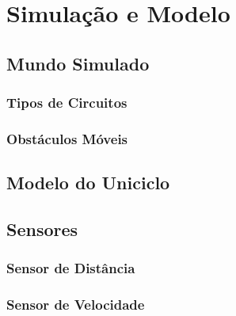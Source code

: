 \chapter{Simulação e Modelo}
\label{ch10}

\section{Mundo Simulado}
\subsection{Tipos de Circuitos}
\subsection{Obstáculos Móveis}

\section{Modelo do Uniciclo}

\section{Sensores}
\subsection{Sensor de Distância}
\subsection{Sensor de Velocidade}
